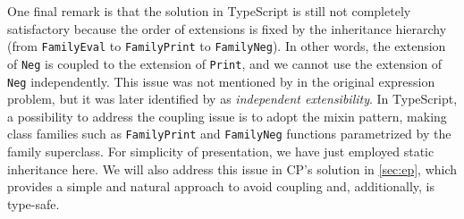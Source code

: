 One final remark is that the solution in TypeScript is still not completely
satisfactory because the order of extensions is fixed by the inheritance
hierarchy (from \lstinline{FamilyEval} to \lstinline{FamilyPrint} to
\lstinline{FamilyNeg}). In other words, the extension of \lstinline{Neg} is
coupled to the extension of \lstinline{Print}, and we cannot use the extension
of \lstinline{Neg} independently. This issue was not mentioned by
\citeauthor{wadler1998expression} in the original expression problem, but it was
later identified by \citet{zenger2005independently} as \emph{independent
extensibility}. In TypeScript, a possibility to address the coupling issue is to
adopt the mixin pattern, making class families such as \lstinline{FamilyPrint}
and \lstinline{FamilyNeg} functions parametrized by the family superclass. For
simplicity of presentation, we have just employed static inheritance here. We
will also address this issue in CP's solution in \autoref{sec:ep}, which
provides a simple and natural approach to avoid coupling and, additionally, is
type-safe.
